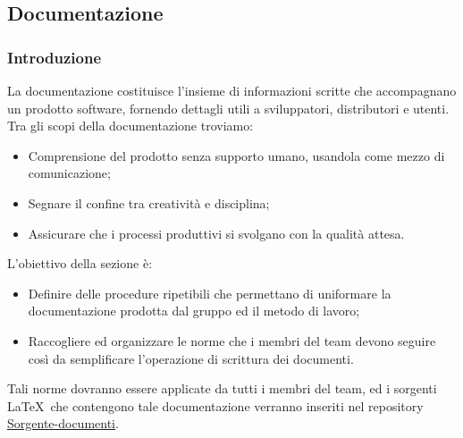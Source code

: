 \subsection{Documentazione}

\subsubsection{Introduzione}
La documentazione costituisce l'insieme di informazioni scritte che accompagnano un prodotto software, fornendo dettagli utili a sviluppatori, distributori e utenti.\\
Tra gli scopi della documentazione troviamo:
\begin{itemize}
    \item Comprensione del prodotto senza supporto umano, usandola come mezzo di comunicazione;
    \item Segnare il confine tra creatività e disciplina;
    \item Assicurare che i processi produttivi si svolgano con la qualità attesa.
\end{itemize}

L'obiettivo della sezione è:
\begin{itemize}
    \item  Definire delle procedure ripetibili che permettano di uniformare la documentazione prodotta dal gruppo ed il metodo di lavoro;
    \item  Raccogliere ed organizzare le norme che i membri del team devono seguire così da semplificare l'operazione di scrittura dei documenti.
\end{itemize}
Tali norme dovranno essere applicate da tutti i membri del team, ed i sorgenti \LaTeX\ che contengono tale documentazione verranno inseriti nel repository \href{https://github.com/ByteOps-swe/Sorgente-documenti}{Sorgente-documenti}.

\begin{comment} \paragraph*{Primi approcci alla redazione di documenti e problematiche riscontrate}
Per la composizione iniziale dei documenti richiesti per la candidatura, è stato sperimentato un'approccio che impiegava gli strumenti di Google Drive. Tale metodologia consentiva ai redattori di redigere agevolmente i documenti senza la necessità di padroneggiare la sintassi LaTeX, con l'intenzione di trasporre successivamente il contenuto in LaTeX una volta che fosse stato validato dai verificatori. Tuttavia, questo approccio ha suscitato problematiche, tra cui:
\begin{itemize}
    \item Rischio di incoerenza tra il contenuto presente negli strumenti di Google Drive.
    \item Prolungato impiego di tempo per la riscrittura in LaTeX, dovuto alla necessità di un passaggio aggiuntivo.
\end{itemize}
Per tali ragioni si è presa la decisione di adottare un nuovo approccio.
\end{comment}
